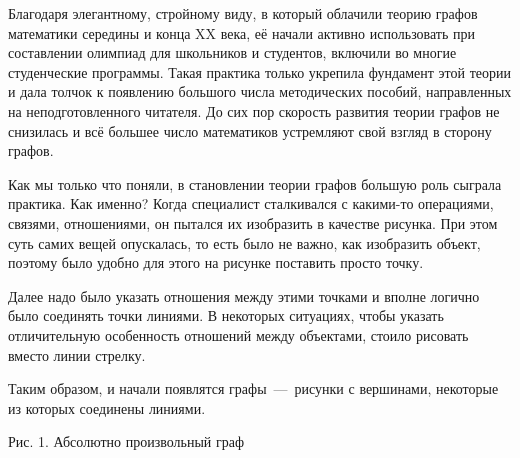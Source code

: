 	Благодаря элегантному, стройному виду, в который облачили теорию графов математики середины и конца XX века, её начали активно использовать при составлении олимпиад для школьников и студентов, включили во многие студенческие программы. Такая практика только укрепила фундамент этой теории и дала толчок к появлению большого числа методических пособий, направленных на неподготовленного читателя. До сих пор скорость развития теории графов не снизилась и всё большее число математиков устремляют свой взгляд в сторону графов.
\begin{paracol}{2}
	Как мы только что поняли, в становлении теории графов большую роль сыграла практика. Как именно? Когда специалист сталкивался с какими-то операциями, связями, отношениями, он пытался их изобразить в качестве рисунка. При этом суть самих вещей опускалась, то есть было не важно, как изобразить объект, поэтому было удобно для этого на рисунке поставить просто точку.
	
	Далее надо было указать отношения между этими точками и вполне логично было соединять точки линиями. В некоторых ситуациях, чтобы указать отличительную особенность отношений между объектами, стоило рисовать вместо линии стрелку.
	
	Таким образом, и начали появлятся графы~---~рисунки с вершинами, некоторые из которых соединены линиями.
	 
\switchcolumn

\begin{center}
	Рис. 1. Абсолютно произвольный граф 
\end{center}\end{paracol}
	

